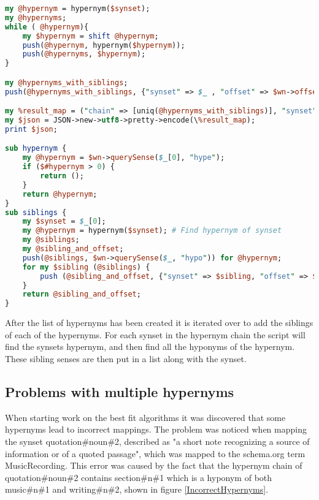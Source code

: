 \begin{lstlisting}[float=t, language=perl, label=HypernymChainCode, caption={Excerpt from the hypernym chain Perl script}]
my @hypernym = hypernym($synset);
my @hypernyms;
while ( @hypernym){
	my $hypernym = shift @hypernym;
	push(@hypernym, hypernym($hypernym));
	push(@hypernyms, $hypernym);
}

my @hypernyms_with_siblings;
push(@hypernyms_with_siblings, {"synset" => $_ , "offset" => $wn->offset($_) ,"siblings" => [siblings($_)]}) for @hypernyms;

my %result_map = ("chain" => [uniq(@hypernyms_with_siblings)], "synset" => $synset, "offset"=> $wn->offset($synset), "siblings" => [siblings($synset)]);
my $json = JSON->new->utf8->pretty->encode(\%result_map);
print $json;

sub hypernym {
	my @hypernym = $wn->querySense($_[0], "hype");
	if ($#hypernym > 0) {
		return ();
	}
	return @hypernym;
}
sub siblings {
	my $synset = $_[0];
	my @hypernym = hypernym($synset); # Find hypernym of synset
	my @siblings;
	my @sibling_and_offset;
	push(@siblings, $wn->querySense($_, "hypo")) for @hypernym;
	for my $sibling (@siblings) {
		push (@sibling_and_offset, {"synset" => $sibling, "offset" => $wn->offset($sibling)});
	}
	return @sibling_and_offset;
}
\end{lstlisting}


After the list of hypernyms has been created it is iterated over to add the siblings of each of the hypernyms.
For each synset in the hypernym chain the script will find the synsets hypernym,
and then find all the hyponyms of the hypernym.
These sibling senses are then put in a list along with the synset.

\subsection{Problems with multiple hypernyms}
When starting work on the best fit algorithms it was discovered that some hypernyms lead to incorrect mappings.
The problem was noticed when mapping the synset quotation\#noun\#2,
described as "a short note recognizing a source of information or of a quoted passage",
which was mapped to the schema.org term MusicRecording.
This error was caused by the fact that the hypernym chain of quotation\#noun\#2 contains
section\#n\#1 which is a hyponym of both music\#n\#1 and writing\#n\#2, shown in figure \ref{IncorrectHypernyms}.


